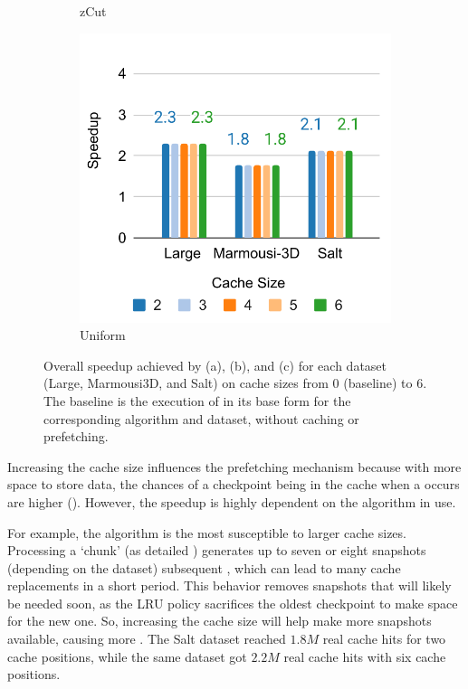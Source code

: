 \documentclass[Ingles,Final]{ic-tese-v3}
\begin{document}
\begin{figure}[h!]
\begin{subfigure}[b]{0.33\textwidth}
        \caption{zCut}
        \label{fig:prefetch_speedup_zcut}
    \end{subfigure}
    \hfill
    \begin{subfigure}[b]{0.32\textwidth}
        \includegraphics[width=\textwidth]{figures/prefetch_speedup/prefetch_speedup_uniform.pdf}
        \caption{Uniform}
        \label{fig:prefetch_speedup_uniform}
    \end{subfigure}
    
    \caption[Overall speedup (\checkpointprefetching)]{Overall speedup achieved by \revolve (a), \zcut (b), and \uniform (c) for each dataset (Large, Marmousi3D, and Salt) on cache sizes from 0 (baseline) to 6. The baseline is the execution of \awave in its base form for the corresponding algorithm and dataset, without caching or prefetching.}
    \label{fig:prefetch_speedup}
\end{figure}

Increasing the cache size influences the prefetching mechanism because with more space to store \checkpointing data, the chances of a checkpoint being in the cache when a \restore occurs are higher (). However, the speedup is highly dependent on the \checkpointing algorithm in use.

For example, the \revolve algorithm is the most susceptible to larger cache sizes. Processing a `chunk' (as detailed ) generates up to seven or eight snapshots (depending on the dataset) subsequent \save, which can lead to many cache replacements in a short period. This behavior removes snapshots that will likely be needed soon, as the LRU policy sacrifices the oldest checkpoint to make space for the new one. So, increasing the cache size will help make more snapshots available, causing more . The Salt dataset reached $1.8 M$ real cache hits for two cache positions, while the same dataset got $2.2 M$ real cache hits with six cache positions.
\end{document}
